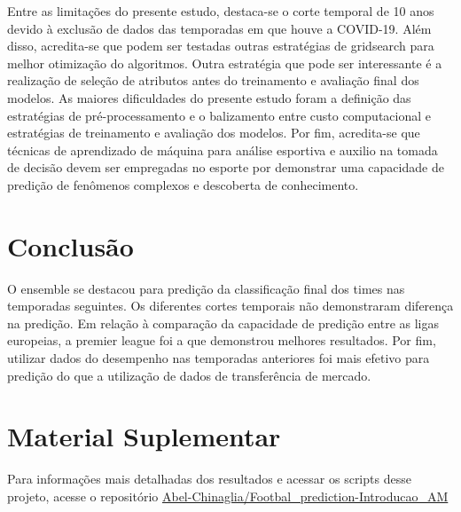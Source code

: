 \documentclass[a4paper]{article}
\theoremstyle{plain}
\theoremstyle{definition}
\begin{document}
Entre as limitações do presente estudo, destaca-se o corte temporal de 10 anos devido à exclusão de dados das temporadas em que houve a COVID-19. Além disso, acredita-se que podem ser testadas outras estratégias de gridsearch para melhor otimização do algoritmos. Outra estratégia que pode ser interessante é a realização de seleção de atributos antes do treinamento e avaliação final dos modelos. As maiores dificuldades do presente estudo foram a definição das estratégias de pré-processamento e o balizamento entre custo computacional e estratégias de treinamento e avaliação dos modelos. Por fim, acredita-se que técnicas de aprendizado de máquina para análise esportiva e auxilio na tomada de decisão devem ser empregadas no esporte por demonstrar uma capacidade de predição de fenômenos complexos e descoberta de conhecimento\cite{claudino2019current}.



\section{Conclusão}
O ensemble se destacou para predição da classificação final dos times nas temporadas seguintes. Os diferentes cortes temporais não demonstraram diferença na predição. Em relação à comparação da capacidade de predição entre as ligas europeias, a premier league foi a que demonstrou melhores resultados. Por fim, utilizar dados do desempenho nas temporadas anteriores foi mais efetivo para predição do que a utilização de dados de transferência de mercado. 

\section{Material Suplementar}
Para informações mais detalhadas dos resultados e acessar os scripts desse projeto, acesse o repositório \href{https://github.com/Abel-Chinaglia/Footbal_prediction-Introducao_AM}{Abel-Chinaglia/Footbal\_prediction-Introducao\_AM}


\end{document}
